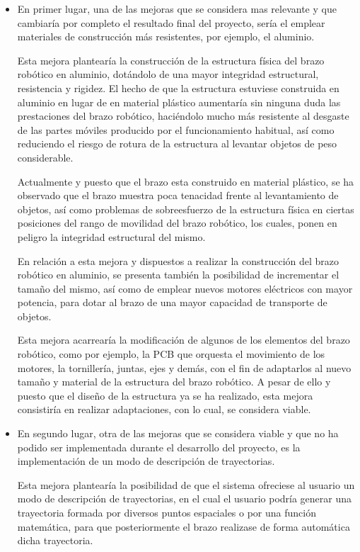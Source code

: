\begin{itemize}
    \item En primer lugar, una de las mejoras que se considera mas relevante y que cambiaría por completo el resultado final del proyecto, sería el emplear materiales de construcción más resistentes, por ejemplo, el aluminio.
    
    Esta mejora plantearía la construcción de la estructura física del brazo robótico en aluminio, dotándolo de una mayor integridad estructural, resistencia y rigidez. El hecho de que la estructura estuviese construida en aluminio en lugar de en material plástico aumentaría sin ninguna duda las prestaciones del brazo robótico, haciéndolo mucho más resistente al desgaste de las partes móviles producido por el funcionamiento habitual, así como reduciendo el riesgo de rotura de la estructura al levantar objetos de peso considerable.
    
    Actualmente y puesto que el brazo esta construido en material plástico, se ha observado que el brazo muestra poca tenacidad frente al levantamiento de objetos, así como problemas de sobreesfuerzo de la estructura física en ciertas posiciones del rango de movilidad del brazo robótico, los cuales, ponen en peligro la integridad estructural del mismo.
    
    En relación a esta mejora y dispuestos a realizar la construcción del brazo robótico en aluminio, se presenta también la posibilidad de incrementar el tamaño del mismo, así como de emplear nuevos motores eléctricos con mayor potencia, para dotar al brazo de una mayor capacidad de transporte de objetos.
    
    Esta mejora acarrearía la modificación de algunos de los elementos del brazo robótico, como por ejemplo, la PCB que orquesta el movimiento de los motores, la tornillería, juntas, ejes y demás, con el fin de adaptarlos al nuevo tamaño y material de la estructura del brazo robótico. A pesar de ello y puesto que el diseño de la estructura ya se ha realizado, esta mejora consistiría en realizar adaptaciones, con lo cual, se considera viable.
    
    \item En segundo lugar, otra de las mejoras que se considera viable y que no ha podido ser implementada durante el desarrollo del proyecto, es la implementación de un modo de descripción de trayectorias.
    
    Esta mejora plantearía la posibilidad de que el sistema ofreciese al usuario un modo de descripción de trayectorias, en el cual el usuario podría generar una trayectoria formada por diversos puntos espaciales o por una función matemática, para que posteriormente el brazo realizase de forma automática dicha trayectoria.
    

\end{itemize}
